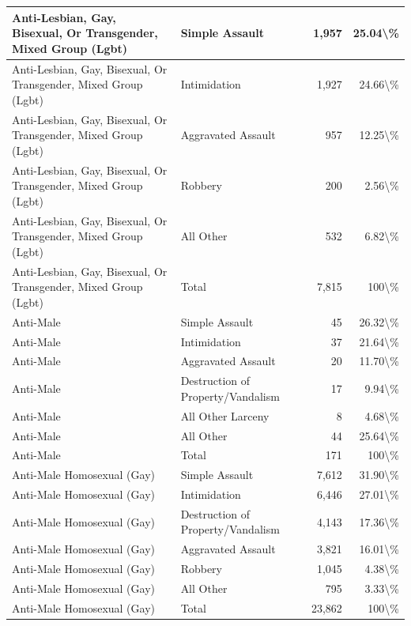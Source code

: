 \documentclass[
]{krantz}
\begin{document}
\begin{longtable}[t]{l|l|r|r}
\hline
Anti-Lesbian, Gay, Bisexual, Or Transgender, Mixed Group (Lgbt) & Simple Assault & 1,957 & 25.04\textbackslash{}\%\\
\hline
Anti-Lesbian, Gay, Bisexual, Or Transgender, Mixed Group (Lgbt) & Intimidation & 1,927 & 24.66\textbackslash{}\%\\
\hline
Anti-Lesbian, Gay, Bisexual, Or Transgender, Mixed Group (Lgbt) & Aggravated Assault & 957 & 12.25\textbackslash{}\%\\
\hline
Anti-Lesbian, Gay, Bisexual, Or Transgender, Mixed Group (Lgbt) & Robbery & 200 & 2.56\textbackslash{}\%\\
\hline
Anti-Lesbian, Gay, Bisexual, Or Transgender, Mixed Group (Lgbt) & All Other & 532 & 6.82\textbackslash{}\%\\
\hline
Anti-Lesbian, Gay, Bisexual, Or Transgender, Mixed Group (Lgbt) & Total & 7,815 & 100\textbackslash{}\%\\
\hline
Anti-Male & Simple Assault & 45 & 26.32\textbackslash{}\%\\
\hline
Anti-Male & Intimidation & 37 & 21.64\textbackslash{}\%\\
\hline
Anti-Male & Aggravated Assault & 20 & 11.70\textbackslash{}\%\\
\hline
Anti-Male & Destruction of Property/Vandalism & 17 & 9.94\textbackslash{}\%\\
\hline
Anti-Male & All Other Larceny & 8 & 4.68\textbackslash{}\%\\
\hline
Anti-Male & All Other & 44 & 25.64\textbackslash{}\%\\
\hline
Anti-Male & Total & 171 & 100\textbackslash{}\%\\
\hline
Anti-Male Homosexual (Gay) & Simple Assault & 7,612 & 31.90\textbackslash{}\%\\
\hline
Anti-Male Homosexual (Gay) & Intimidation & 6,446 & 27.01\textbackslash{}\%\\
\hline
Anti-Male Homosexual (Gay) & Destruction of Property/Vandalism & 4,143 & 17.36\textbackslash{}\%\\
\hline
Anti-Male Homosexual (Gay) & Aggravated Assault & 3,821 & 16.01\textbackslash{}\%\\
\hline
Anti-Male Homosexual (Gay) & Robbery & 1,045 & 4.38\textbackslash{}\%\\
\hline
Anti-Male Homosexual (Gay) & All Other & 795 & 3.33\textbackslash{}\%\\
\hline
Anti-Male Homosexual (Gay) & Total & 23,862 & 100\textbackslash{}\%\\
\hline

\end{longtable}
\end{document}
